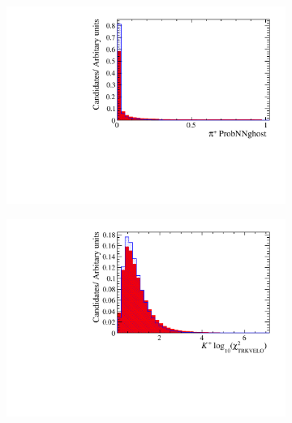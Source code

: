 \begin{figure}[!h]
\begin{subfigure}[t]{0.22\textwidth}
   \end{subfigure}
   \begin{subfigure}[t]{0.22\textwidth}
      \centering
      \includegraphics[width=1.0\textwidth]{figs/Selection/Ds_BDT_Var_Ds2KKPi_D_P_MC15TuneV1_ProbNNghost.pdf}
   \end{subfigure}
   \begin{subfigure}[t]{0.22\textwidth}
      \centering
      \includegraphics[width=1.0\textwidth]{figs/Selection/Ds_BDT_Var_Ds2KKPi_D_K0_BDT_TRACK_VeloCHI2NDOF.pdf}
   \end{subfigure}
   \begin{subfigure}[t]{0.22\textwidth}
      \centering

\end{subfigure}
\end{figure}
